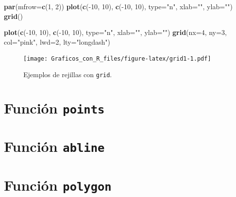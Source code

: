 \documentclass[10pt,]{krantz}
\makeatletter
\newenvironment{Shaded}{\begin{snugshade}}{\end{snugshade}}
\newcommand{\KeywordTok}[1]{\textcolor[rgb]{0.13,0.29,0.53}{\textbf{{#1}}}}
\newcommand{\DataTypeTok}[1]{\textcolor[rgb]{0.13,0.29,0.53}{{#1}}}
\newcommand{\DecValTok}[1]{\textcolor[rgb]{0.00,0.00,0.81}{{#1}}}
\newcommand{\StringTok}[1]{\textcolor[rgb]{0.31,0.60,0.02}{{#1}}}
\newcommand{\NormalTok}[1]{{#1}}
\newenvironment{kframe}{%
\medskip{}
\setlength{\fboxsep}{.8em}
 \def\at@end@of@kframe{}%
 \ifinner\ifhmode%
  \def\at@end@of@kframe{\end{minipage}}%
  \begin{minipage}{\columnwidth}%
 \fi\fi%
 \def\FrameCommand##1{\hskip\@totalleftmargin \hskip-\fboxsep
 \colorbox{shadecolor}{##1}\hskip-\fboxsep
     \hskip-\linewidth \hskip-\@totalleftmargin \hskip\columnwidth}%
 \MakeFramed {\advance\hsize-\width
   \@totalleftmargin\z@ \linewidth\hsize
   \@setminipage}}%
 {\par\unskip\endMakeFramed%
 \at@end@of@kframe}
\renewenvironment{Shaded}{\begin{kframe}}{\end{kframe}}
\makeatother
\begin{document}
\begin{Shaded}
\begin{Highlighting}[]
\KeywordTok{par}\NormalTok{(}\DataTypeTok{mfrow=}\KeywordTok{c}\NormalTok{(}\DecValTok{1}\NormalTok{, }\DecValTok{2}\NormalTok{))}
\KeywordTok{plot}\NormalTok{(}\KeywordTok{c}\NormalTok{(-}\DecValTok{10}\NormalTok{, }\DecValTok{10}\NormalTok{), }\KeywordTok{c}\NormalTok{(-}\DecValTok{10}\NormalTok{, }\DecValTok{10}\NormalTok{), }\DataTypeTok{type=}\StringTok{"n"}\NormalTok{, }\DataTypeTok{xlab=}\StringTok{""}\NormalTok{, }\DataTypeTok{ylab=}\StringTok{""}\NormalTok{)}
\KeywordTok{grid}\NormalTok{()}

\KeywordTok{plot}\NormalTok{(}\KeywordTok{c}\NormalTok{(-}\DecValTok{10}\NormalTok{, }\DecValTok{10}\NormalTok{), }\KeywordTok{c}\NormalTok{(-}\DecValTok{10}\NormalTok{, }\DecValTok{10}\NormalTok{), }\DataTypeTok{type=}\StringTok{"n"}\NormalTok{, }\DataTypeTok{xlab=}\StringTok{""}\NormalTok{, }\DataTypeTok{ylab=}\StringTok{""}\NormalTok{)}
\KeywordTok{grid}\NormalTok{(}\DataTypeTok{nx=}\DecValTok{4}\NormalTok{, }\DataTypeTok{ny=}\DecValTok{3}\NormalTok{, }\DataTypeTok{col=}\StringTok{"pink"}\NormalTok{, }\DataTypeTok{lwd=}\DecValTok{2}\NormalTok{, }\DataTypeTok{lty=}\StringTok{"longdash"}\NormalTok{)}
\end{Highlighting}
\end{Shaded}

\begin{figure}[htbp]
\centering
\texttt{[image: Graficos\_con\_R\_files/figure-latex/grid1-1.pdf]}
\caption{\label{fig:grid1}Ejemplos de rejillas con \texttt{grid}.}
\end{figure}

\section{\texorpdfstring{Función \texttt{points} 
}{Función points  }}\label{funcion-points}

\section{\texorpdfstring{Función \texttt{abline}
}{Función abline }}\label{funcion-abline}

\section{\texorpdfstring{Función \texttt{polygon} 
}{Función polygon  }}\label{funcion-polygon}
\end{document}
